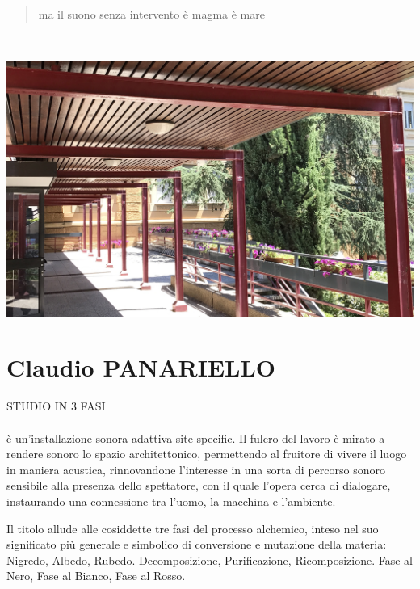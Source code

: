 \documentclass[
	a0,
	portrait
	]{a0poster}
\begin{document}
\begin{multicols}{4}
\begin{quotation}
\begin{it}
\begin{flushright}
\noindent ma il suono senza intervento è magma è mare
\end{flushright}
\end{it}
\end{quotation}

\vfill

~

\columnbreak


\begin{center}
\includegraphics[width=1.\linewidth]{panariello_Solenoidi_sugli_archi}
\end{center}

\section*{\color{cyellow}Claudio PANARIELLO}

\lettrine{STUDIO IN 3 FASI}{}\\~\\ è un’installazione sonora adattiva site specific. Il fulcro del lavoro è mirato a rendere sonoro lo spazio architettonico, permettendo al fruitore di vivere il luogo in maniera acustica, rinnovandone l’interesse in una sorta di percorso sonoro sensibile alla presenza dello spettatore, con il quale l’opera cerca di dialogare, instaurando una connessione tra l’uomo, la macchina e l'ambiente.

Il titolo allude alle cosiddette tre fasi del processo alchemico, inteso nel suo significato più generale e simbolico di conversione e mutazione della materia: Nigredo, Albedo, Rubedo. Decomposizione, Purificazione, Ricomposizione. Fase al Nero, Fase al Bianco, Fase al Rosso.


\end{multicols}
\end{document}
